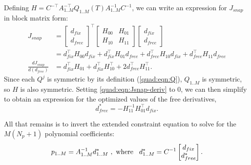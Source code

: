 Defining $H = C^{-\top} A_{1..M}^{-\top} Q_{1..M}(T) A_{1..M}^{-1} C^{-1}$, we can write an expression for $J_{snap}$ in block matrix form:
\begin{align}
    J_{snap} &= {\begin{bmatrix}
                        d_{fix} \\
                        d_{free}
                   \end{bmatrix}}^\top
                   \begin{bmatrix}
                        H_{00} & H_{01} \\
                        H_{10} & H_{11}
                   \end{bmatrix}
                   \begin{bmatrix}
                        d_{fix} \\
                        d_{free}
                   \end{bmatrix} \\
                &= d_{fix}^\top H_{00} d_{fix} + d_{fix}^\top H_{01} d_{free} +
                   d_{free}^\top H_{10} d_{fix} + d_{free}^\top H_{11} d_{free} \\
    \frac{dJ_{snap} }{d(d_{free})}
                &= d_{fix}^\top H_{01} + d_{fix}^\top H_{10}^\top + 2d_{free}^\top H_{11}^\top. \label{quad:eqn:Jsnap-deriv}
\end{align}
Since each $Q^j$ is symmetric by its definition (\autoref{quad:eqn:Q}), $Q_{1..M}$ is symmetric, so $H$ is also symmetric. Setting \autoref{quad:eqn:Jsnap-deriv} to 0, we can then simplify to obtain an expression for the optimized values of the free derivatives,
\begin{equation}
    d_{free}^* = -H_{11}^{-1} H_{01}^\top d_{fix}.
\label{quad:eqn:dfree*}
\end{equation}


All that remains is to invert the extended constraint equation to solve for the $M(N_p + 1)$ polynomial coefficients:
\begin{equation}
    p_{1..M} = A_{1..M}^{-1} d_{1..M}^* \ , \text{ where}\hspace{3mm}
    d_{1..M}^* = C^{-1}    \begin{bmatrix}
                              d_{fix} \\
                              d_{free}^*
                         \end{bmatrix}.
\label{quad:eqn:final_poly}
\end{equation}





